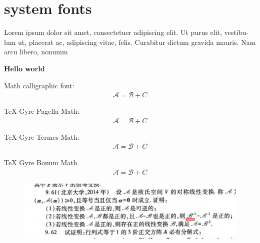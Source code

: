 \documentclass{article}
\begin{document}
\section{system fonts}
Lorem ipsum dolor sit amet, consectetuer adipiscing elit. Ut purus elit, vestibu-
lum ut, placerat ac, adipiscing vitae, felis. Curabitur dictum gravida mauris.
Nam arcu libero, nonumm

\textbf{Hello world}

Math calligraphic font:
\begin{align}
    \mathscr{A} = \mathscr{B}+C    
\end{align}


TeX Gyre Pagella Math:
\begin{align}
    \mathscr{A} = \mathscr{B}+C    
\end{align}

TeX Gyre Termes Math:
\begin{align}
    \mathscr{A} = \mathscr{B}+C    
\end{align}

TeX Gyre Bonum Math
\begin{align}
    \mathscr{A} = \mathscr{B}+C    
\end{align}

\begin{figure}[!htb]
    \centering
    \includegraphics[width=.75\linewidth]{./example.png}
\end{figure}
\end{document}
